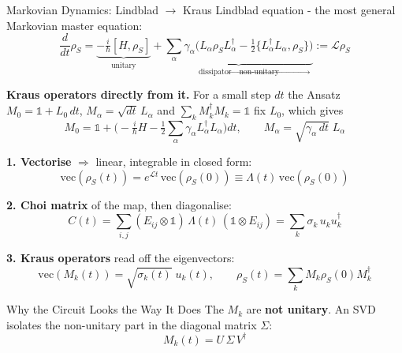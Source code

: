 \begin{frame}[t]{}
\begin{postercolumn}
  \begin{block}{Markovian Dynamics: Lindblad $\rightarrow$ Kraus}
    Lindblad equation - the most general Markovian master equation:
    \[ \frac{d}{dt}\rho_S = \underbrace{-\tfrac{i}{\hbar}[H,\rho_S]}_{\text{unitary}}
       + \underbrace{\sum_\alpha \gamma_\alpha \Big( L_\alpha \rho_S L^\dagger_\alpha
         - \tfrac12 \{ L^\dagger_\alpha L_\alpha, \rho_S \} \Big)}_{\text{dissipator} \rightarrow \text{non-unitary}} := \mathcal{L} \rho_S \]

    \textbf{Kraus operators directly from it.} For a small step $dt$ the
    Ansatz $M_0=\mathbb{1}+L_0\,dt$, $M_\alpha=\sqrt{dt}\,L_\alpha$ and
    $\sum_k M^\dagger_k M_k=\mathbb{1}$ fix $L_0$, which gives
    \[ M_0 = \mathbb{1} + \Big(-\tfrac{i}{\hbar}H
             - \tfrac12\sum_\alpha \gamma_\alpha L^\dagger_\alpha L_\alpha\Big) dt,
       \qquad M_\alpha = \sqrt{\gamma_\alpha\,dt}\;L_\alpha \]

    \textbf{1. Vectorise} $\Rightarrow$ linear, integrable in closed form:
    \[ \mathrm{vec}(\rho_S(t)) = e^{\mathcal{L}t}\,\mathrm{vec}(\rho_S(0))
       \equiv \Lambda(t)\,\mathrm{vec}(\rho_S(0)) \]

    \textbf{2. Choi matrix} of the map, then diagonalise:
    \[ C(t) = \sum_{i,j}(E_{ij}\otimes \mathbb{1})\,\Lambda(t)\,(\mathbb{1} \otimes E_{ij})
            = \sum_k \sigma_k\, u_k u^\dagger_k \]

    \textbf{3. Kraus operators} read off the eigenvectors:
    \[ \mathrm{vec}(M_k(t)) = \sqrt{\sigma_k(t)}\; u_k(t),
       \qquad \rho_S(t) = \sum_k M_k \rho_S(0) M^\dagger_k \]
  \end{block}

  \begin{block}{Why the Circuit Looks the Way It Does}
    The $M_k$ are \textbf{not unitary}. An SVD isolates the non-unitary
    part in the diagonal matrix $\Sigma$:
    \[ M_k(t) = U\,\Sigma\,V^\dagger \]


\end{block}
\end{postercolumn}
\end{frame}
